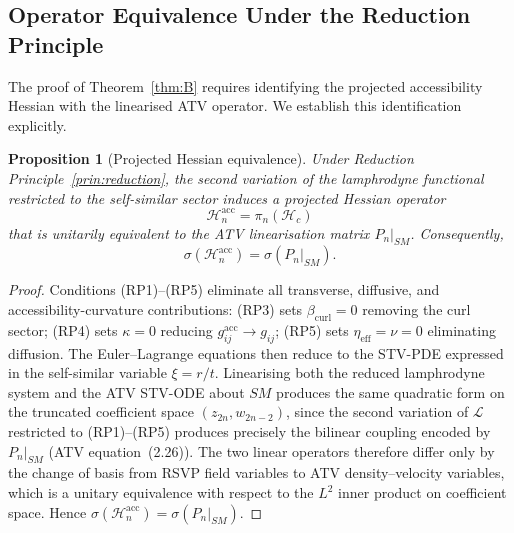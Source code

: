 \documentclass[12pt,a4paper]{article}
\theoremstyle{plain}
\newtheorem{proposition}[theorem]{Proposition}
\theoremstyle{definition}
\theoremstyle{remark}
\newcommand{\piproj}{\pi}
\newcommand{\Hacc}{\mathcal{H}}
\newcommand{\Lacc}{\mathcal{L}}
\newcommand{\SM}{\mathit{SM}}
\newcommand{\etaeff}{\eta_{\mathrm{eff}}}
\newcommand{\bcurl}{\beta_{\mathrm{curl}}}
\begin{document}
\subsection{Operator Equivalence Under the Reduction Principle}
\label{subsec:operator_equiv}

The proof of Theorem~\ref{thm:B} requires identifying the projected accessibility
Hessian with the linearised ATV operator. We establish this identification explicitly.

\begin{proposition}[Projected Hessian equivalence]
\label{prop:operator_equiv}
Under Reduction Principle~\ref{prin:reduction}, the second variation of the
lamphrodyne functional restricted to the self-similar sector induces a projected
Hessian operator
\begin{equation}
  \mathcal{H}_n^{\mathrm{acc}} = \piproj_n(\Hacc_c)
  \label{eq:proj_hess}
\end{equation}
that is unitarily equivalent to the ATV linearisation matrix $P_n|_{\SM}$.
Consequently,
\begin{equation}
  \sigma(\mathcal{H}_n^{\mathrm{acc}}) = \sigma(P_n|_{\SM}).
  \label{eq:spectral_equiv}
\end{equation}
\end{proposition}

\begin{proof}
Conditions (RP1)--(RP5) eliminate all transverse, diffusive, and
accessibility-curvature contributions: (RP3) sets $\bcurl = 0$ removing the
curl sector; (RP4) sets $\kappa = 0$ reducing $g^{\mathrm{acc}}_{ij}\to g_{ij}$;
(RP5) sets $\etaeff = \nu = 0$ eliminating diffusion. The Euler--Lagrange equations
then reduce to the STV-PDE expressed in the self-similar variable $\xi = r/t$.
Linearising both the reduced lamphrodyne system and the ATV STV-ODE about $\SM$
produces the same quadratic form on the truncated coefficient space $(z_{2n},w_{2n-2})$,
since the second variation of $\Lacc$ restricted to (RP1)--(RP5) produces precisely
the bilinear coupling encoded by $P_n|_{\SM}$ (ATV equation~(2.26)). The two
linear operators therefore differ only by the change of basis from RSVP field
variables to ATV density--velocity variables, which is a unitary equivalence
with respect to the $L^2$ inner product on coefficient space. Hence
$\sigma(\mathcal{H}_n^{\mathrm{acc}}) = \sigma(P_n|_{\SM})$.
\end{proof}
\end{document}
